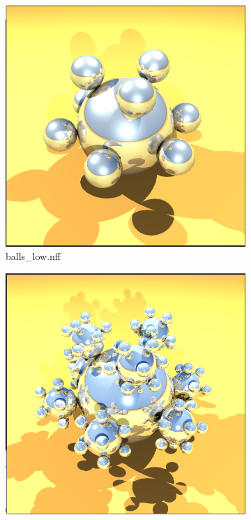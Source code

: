 \documentclass{article}
\begin{document}
    \begin{figure}[h!]
        \centering
        \begin{subfigure}{.2\linewidth}
            \centering
            \includegraphics[width=\linewidth]{balls_low.png}
            \caption{balls\_low.nff}
            \label{fig:balls_low}
        \end{subfigure}
        \begin{subfigure}{.2\textwidth}
            \centering
            \includegraphics[width=\linewidth]{balls_medium.png}

\end{subfigure}
\end{figure}
\end{document}
